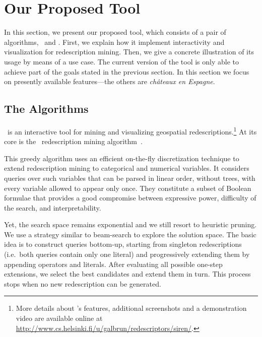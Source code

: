 \section{Our Proposed Tool}
In this section, we present our proposed tool, which consists of a
pair of algorithms, \ReReMi\ and \Siren. First, we explain how it
implement interactivity and visualization for redescription mining.
Then, we give a concrete illustration of its usage by means of a use
case.  The current version of the tool is only able to achieve part of
the goals stated in the previous section. In this section we focus on
presently available features---the others are \emph{ch\^{a}teaux en
  Espagne}.

\subsection{The Algorithms}
\label{sec:algorithms}

\Siren\ is
an interactive tool for mining and visualizing geospatial
redescriptions.\!\footnote{More details about \Siren's features, additional
  screenshots and a demonstration video are available online at
  \url{http://www.cs.helsinki.fi/u/galbrun/redescriptors/siren/}.}  At its core is the \ReReMi\ redescription mining
algorithm~\cite{galbrun12black}.

This greedy algorithm
uses an efficient on-the-fly discretization technique to extend
redescription mining to categorical and numerical variables.
It considers queries over such variables that can be parsed in linear
order, without trees, with every variable allowed to appear only once.
They constitute a subset of Boolean formulae that
provides a good compromise between expressive power, difficulty of the
search, and interpretability.

Yet, the search space remains exponential and we still resort to
heuristic pruning.  We use a strategy similar to
beam-search to explore the solution space.  The basic idea is to
construct queries bottom-up, starting from singleton redescriptions
(i.e.\ both queries contain only one literal) and progressively
extending them by appending operators and
literals. %
After evaluating all possible one-step extensions, we select the best
candidates and extend them in turn. This process stops when no new
redescription can be generated.

